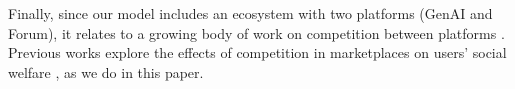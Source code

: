 Finally, since our model includes an ecosystem with two platforms (GenAI and Forum), it relates to a growing body of work on competition between platforms \cite{rietveld2021platform, karle2020segmentation, bergemann2024data, Tullock1980}. Previous works explore the effects of competition in marketplaces on users' social welfare \cite{jagadeesan2023competition, feldman2013competition}, as we do in this paper. 
